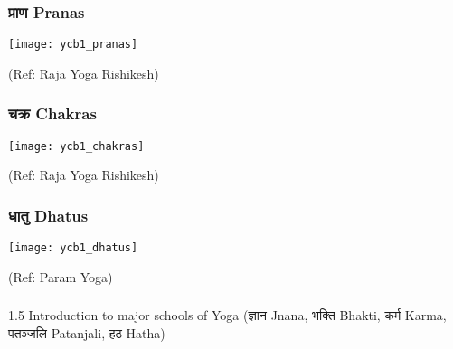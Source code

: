 \begin{frame}[fragile]\frametitle{प्राण Pranas}
        \begin{center}
        \texttt{[image: ycb1\_pranas]}
				
		{\tiny (Ref: Raja Yoga Rishikesh)}	 
        \end{center}	

\end{frame}
\begin{frame}[fragile]\frametitle{चक्र  Chakras}
        \begin{center}
        \texttt{[image: ycb1\_chakras]}
				
		{\tiny (Ref: Raja Yoga Rishikesh)}	 
        \end{center}	

\end{frame}

\begin{frame}[fragile]\frametitle{धातु Dhatus}
        \begin{center}
        \texttt{[image: ycb1\_dhatus]}
				
		{\tiny (Ref: Param Yoga)}	 
        \end{center}	

\end{frame}


\begin{frame}[fragile]\frametitle{}
\begin{center}
{\Large 1.5 Introduction to major schools of Yoga (ज्ञान Jnana, भक्ति  Bhakti, कर्म  Karma, पतञ्जलि  Patanjali, हठ Hatha)}
\end{center}
\end{frame}

